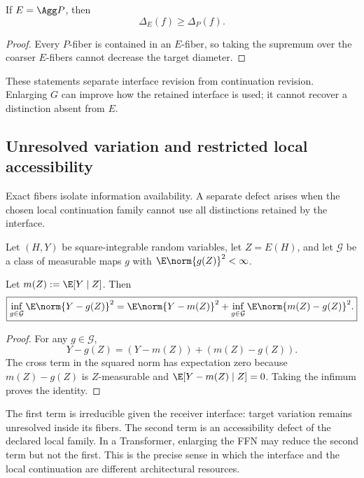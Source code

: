 \begin{proposition}\label{prop:aggregation-monotonicity}
If $E=\Agg P$, then
\[
\Delta_E(f)\ge\Delta_P(f).
\]
\end{proposition}

\begin{proof}
Every $P$-fiber is contained in an $E$-fiber, so taking the supremum over the coarser $E$-fibers cannot decrease the target diameter.
\end{proof}

These statements separate interface revision from continuation revision. Enlarging $G$ can improve how the retained interface is used; it cannot recover a distinction absent from $E$.

\subsection{Unresolved variation and restricted local accessibility}

Exact fibers isolate information availability. A separate defect arises when the chosen local continuation family cannot use all distinctions retained by the interface.

Let $(H,Y)$ be square-integrable random variables, let $Z=E(H)$, and let $\mathcal G$ be a class of measurable maps $g$ with $\E\norm{g(Z)}^2<\infty$.

\begin{theorem}\label{thm:squared-decomposition}
Let $m(Z):=\E[Y\mid Z]$. Then
\[
\boxed{
\inf_{g\in\mathcal G}\E\norm{Y-g(Z)}^2
=
\E\norm{Y-m(Z)}^2
+
\inf_{g\in\mathcal G}\E\norm{m(Z)-g(Z)}^2.
}
\]
\end{theorem}

\begin{proof}
For any $g\in\mathcal G$,
\[
Y-g(Z)=(Y-m(Z))+(m(Z)-g(Z)).
\]
The cross term in the squared norm has expectation zero because $m(Z)-g(Z)$ is $Z$-measurable and $\E[Y-m(Z)\mid Z]=0$. Taking the infimum proves the identity.
\end{proof}

The first term is irreducible given the receiver interface: target variation remains unresolved inside its fibers. The second term is an accessibility defect of the declared local family. In a Transformer, enlarging the FFN may reduce the second term but not the first. This is the precise sense in which the interface and the local continuation are different architectural resources.

